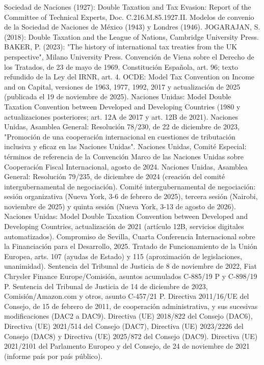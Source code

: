 \documentclass[10pt,a4paper]{article}
\begin{document}
Sociedad de Naciones (1927): Double Taxation and Tax Evasion: Report of the Committee of Technical Experts, Doc. C.216.M.85.1927.II.
Modelos de convenio de la Sociedad de Naciones de México (1943) y Londres (1946).
JOGARAJAN, S. (2018): Double Taxation and the League of Nations, Cambridge University Press.
BAKER, P. (2023): "The history of international tax treaties from the UK perspective", Milano University Press.
Convención de Viena sobre el Derecho de los Tratados, de 23 de mayo de 1969.
Constitución Española, art. 96; texto refundido de la Ley del IRNR, art. 4.
OCDE: Model Tax Convention on Income and on Capital, versiones de 1963, 1977, 1992, 2017 y actualización de 2025 (publicada el 19 de noviembre de 2025).
Naciones Unidas: Model Double Taxation Convention between Developed and Developing Countries (1980 y actualizaciones posteriores; art. 12A de 2017 y art. 12B de 2021).
Naciones Unidas, Asamblea General: Resolución 78/230, de 22 de diciembre de 2023, "Promoción de una cooperación internacional en cuestiones de tributación inclusiva y eficaz en las Naciones Unidas".
Naciones Unidas, Comité Especial: términos de referencia de la Convención Marco de las Naciones Unidas sobre Cooperación Fiscal Internacional, agosto de 2024.
Naciones Unidas, Asamblea General: Resolución 79/235, de diciembre de 2024 (creación del comité intergubernamental de negociación).
Comité intergubernamental de negociación: sesión organizativa (Nueva York, 3-6 de febrero de 2025), tercera sesión (Nairobi, noviembre de 2025) y quinta sesión (Nueva York, 3-13 de agosto de 2026).
Naciones Unidas: Model Double Taxation Convention between Developed and Developing Countries, actualización de 2021 (artículo 12B, servicios digitales automatizados).
Compromiso de Sevilla, Cuarta Conferencia Internacional sobre la Financiación para el Desarrollo, 2025.
Tratado de Funcionamiento de la Unión Europea, arts. 107 (ayudas de Estado) y 115 (aproximación de legislaciones, unanimidad).
Sentencia del Tribunal de Justicia de 8 de noviembre de 2022, Fiat Chrysler Finance Europe/Comisión, asuntos acumulados C-885/19 P y C-898/19 P.
Sentencia del Tribunal de Justicia de 14 de diciembre de 2023, Comisión/Amazon.com y otros, asunto C-457/21 P.
Directiva 2011/16/UE del Consejo, de 15 de febrero de 2011, de cooperación administrativa, y sus sucesivas modificaciones (DAC2 a DAC9).
Directiva (UE) 2018/822 del Consejo (DAC6), Directiva (UE) 2021/514 del Consejo (DAC7), Directiva (UE) 2023/2226 del Consejo (DAC8) y Directiva (UE) 2025/872 del Consejo (DAC9).
Directiva (UE) 2021/2101 del Parlamento Europeo y del Consejo, de 24 de noviembre de 2021 (informe país por país público).
\end{document}
